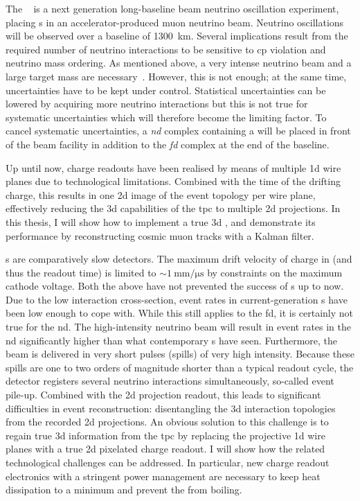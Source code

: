 The \dune{}~\cite{dune1, dune2, dune3, dune4} is a next generation long-baseline beam neutrino oscillation experiment, placing \lartpc{}s in an accelerator-produced muon neutrino beam.
Neutrino oscillations will be observed over a baseline of \SI{1300}{\kilo\metre}.
Several implications result from the required number of neutrino interactions to be sensitive to \gls{cp} violation and neutrino mass ordering.
As mentioned above, a very intense neutrino beam and a large target mass are necessary~\cite{dune3, dune4}.
However, this is not enough; at the same time, uncertainties have to be kept under control.
Statistical uncertainties can be lowered by acquiring more neutrino interactions but this is not true for systematic uncertainties which will therefore become the limiting factor.
To cancel systematic uncertainties, a \emph{\gls{nd}} complex containing a \lartpc{} will be placed in front of the beam facility in addition to the \emph{\gls{fd}} complex at the end of the baseline.

Up until now, \lartpc{} charge readouts have been realised by means of multiple \gls{1d} wire planes due to technological limitations.
Combined with the time of the drifting charge, this results in one \gls{2d} image of the event topology per wire plane, effectively reducing the \gls{3d} capabilities of the \gls{tpc} to multiple \gls{2d} projections.
In this thesis, I will show how to implement a true \gls{3d} \lartpc{}, and demonstrate its performance by reconstructing cosmic muon tracks with a Kalman filter.

\lartpc{}s are comparatively slow detectors.
The maximum drift velocity of charge in \lar{} (and thus the readout time) is limited to $\sim{\SI{1}{\milli\metre\per\micro\second}}$ by constraints on the maximum cathode voltage.
Both the above have not prevented the success of \lartpc{}s up to now.
Due to the low interaction cross-section, event rates in current-generation \lartpc{}s have been low enough to cope with.
While this still applies to the \dune{} \gls{fd}, it is certainly not true for the \gls{nd}.
The high-intensity neutrino beam will result in event rates in the \gls{nd} significantly higher than what contemporary \lartpc{}s have seen.
Furthermore, the beam is delivered in very short pulses (spills) of very high intensity.
Because these spills are one to two orders of magnitude shorter than a typical \lartpc{} readout cycle, the detector registers several neutrino interactions simultaneously, so-called event pile-up.
Combined with the \gls{2d} projection readout, this leads to significant difficulties in event reconstruction: disentangling the \gls{3d} interaction topologies from the recorded \gls{2d} projections.
An obvious solution to this challenge is to regain true \gls{3d} information from the \gls{tpc} by replacing the projective \gls{1d} wire planes with a true \gls{2d} pixelated charge readout.
I will show how the related technological challenges can be addressed.
In particular, new charge readout electronics with a stringent power management are necessary to keep heat dissipation to a minimum and prevent the \lar{} from boiling.

